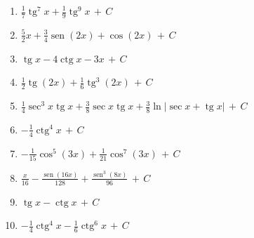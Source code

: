 \documentclass[12pt, letterpaper]{article}
\newcommand{\CC}{\,+\,C}
\DeclareMathOperator{\sen}{sen}
\DeclareMathOperator{\tg}{tg}
\DeclareMathOperator{\ctg}{ctg}
\begin{document}
\begin{enumerate}[leftmargin=*, label=\textbf{\arabic*.}]
  \item $\frac{1}{7}\tg^7 x + \frac{1}{9}\tg^9 x \CC$
  \item $\frac{5}{2}x + \frac{3}{4}\sen(2x) + \cos(2x) \CC$
  \item $\tg x - 4\ctg x - 3x \CC$
  \item $\frac{1}{2}\tg(2x) + \frac{1}{6}\tg^3(2x) \CC$
  \item $\frac{1}{4}\sec^3 x \tg x + \frac{3}{8}\sec x \tg x + \frac{3}{8}\ln|\sec x + \tg x| \CC$
  \item $-\frac{1}{4}\ctg^4 x \CC$
  \item $-\frac{1}{15}\cos^5(3x) + \frac{1}{21}\cos^7(3x) \CC$
  \item $\frac{x}{16} - \frac{\sen(16x)}{128} + \frac{\sen^3(8x)}{96} \CC$
  \item $\tg x - \ctg x \CC$
  \item $-\frac{1}{4}\ctg^4 x - \frac{1}{6}\ctg^6 x \CC$
\end{enumerate}
\end{document}
